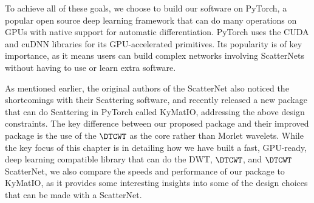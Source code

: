 To achieve all of these goals, we choose to build our software on PyTorch, 
a popular open source deep learning framework that can do many operations on
GPUs with native support for automatic differentiation. PyTorch uses the CUDA 
and cuDNN libraries for its GPU-accelerated primitives. Its popularity
is of key importance, as it means users can build complex networks involving
ScatterNets without having to use or learn extra software.

As mentioned earlier, the original authors of the ScatterNet also noticed the
shortcomings with their Scattering software, and recently released a new package
that can do Scattering in PyTorch called KyMatIO\cite{andreux_kymatio:_2018}, addressing the
above design constraints. The key difference between our proposed package and their
improved package is the use of the $\DTCWT$ as the core rather than 
Morlet wavelets. While the key focus of this chapter is in detailing how we have
built a fast, GPU-ready, deep learning compatible library that can do the
DWT, $\DTCWT$, and $\DTCWT$ ScatterNet, we also compare the speeds and performance
of our package to KyMatIO, as it provides some interesting
insights into some of the design choices that can be made with a ScatterNet.
